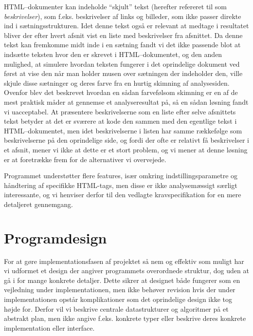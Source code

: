 \documentclass[a4paper,oneside]{memoir}
\begin{document}
HTML--dokumenter kan indeholde ``skjult'' tekst (herefter refereret til
som \textit{beskrivelser}), som f.eks. beskrivelser af links og
billeder, som ikke passer direkte ind i sætningsstrukturen. Idet denne
tekst også er relevant at medtage i resultatet bliver der efter hvert
afsnit vist en liste med beskrivelser fra afsnittet. Da denne tekst
kan fremkomme midt inde i en sætning fandt vi det ikke passende blot
at indsætte teksten hvor den er skrevet i HTML--dokumentet, og den
anden mulighed, at simulere hvordan teksten fungerer i det oprindelige
dokument ved først at vise den når man holder musen over sætningen der
indeholder den, ville skjule disse sætninger og deres farve fra en
hurtig skimning af analysesiden. Ovenfor blev det beskrevet hvordan en
sådan farvefølsom skimning er en af de mest praktisk måder at gennemse
et analyseresultat på, så en sådan løsning fandt vi uacceptabel. At
præsentere beskrivelserne som en liste efter selve afsnittets tekst
betyder at det er sværere at kode den sammen med den egentlige tekst i
HTML--dokumentet, men idet beskrivelserne i listen har samme rækkefølge
som beskrivelserne på den oprindelige side, og fordi der ofte er
relativt få beskrivelser i et afsnit, mener vi ikke at dette er et
stort problem, og vi mener at denne løsning er at foretrække frem for
de alternativer vi overvejede.

Programmet understøtter flere features, især omkring
indstillingsparametre og håndtering af specifikke HTML-tags, men disse
er ikke analysemæssigt særligt interessante, og vi henviser derfor til
den vedlagte kravspecifikation for en mere detaljeret gennemgang.

\chapter{Programdesign}

For at gøre implementationsfasen af projektet så nem og effektiv som
muligt har vi udformet et design der angiver programmets overordnede
struktur, dog uden at gå i for mange konkrete detaljer. Dette sikrer
at designet både fungerer som en vejledning under implementationen,
men ikke behøver revision hvis der under implementationen opstår
komplikationer som det oprindelige design ikke tog højde for. Derfor
vil vi beskrive centrale datastrukturer og algoritmer på et abstrakt
plan, men ikke angive f.eks. konkrete typer eller beskrive deres
konkrete implementation eller interface.
\end{document}
